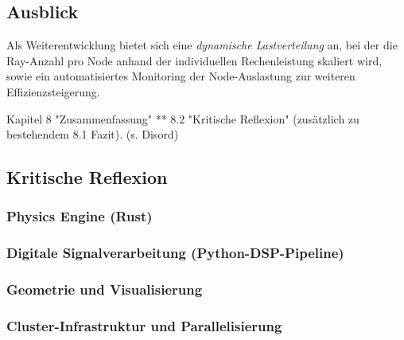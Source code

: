 \subsection{Ausblick}
\label{sec:ausblick}

Als Weiterentwicklung bietet sich eine \emph{dynamische Lastverteilung}
an, bei der die Ray-Anzahl pro Node anhand der individuellen
Rechenleistung skaliert wird, sowie ein automatisiertes Monitoring der
Node-Auslastung zur weiteren Effizienzsteigerung.

Kapitel 8 "Zusammenfassung"
** 8.2 "Kritische Reflexion" (zusätzlich zu bestehendem 8.1 Fazit).
(s. Disord)


\subsection{Kritische Reflexion}
\label{sec:reflexion}

\subsubsection{Physics Engine (Rust)}
\label{sec:reflexion-rust}

\subsubsection{Digitale Signalverarbeitung (Python-DSP-Pipeline)}
\label{sec:reflexion-dsp}

\subsubsection{Geometrie und Visualisierung}
\label{sec:reflexion-geometrie}

\subsubsection{Cluster-Infrastruktur und Parallelisierung}
\label{sec:reflexion-cluster}

